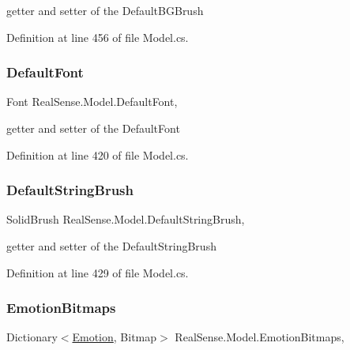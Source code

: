 getter and setter of the Default\+B\+G\+Brush 

Definition at line 456 of file Model.\+cs.

\mbox{\label{class_real_sense_1_1_model_a1e12c6ceac3f412e6b452148b1a97bb1}} 
\subsubsection{\texorpdfstring{Default\+Font}{DefaultFont}}
{\footnotesize\ttfamily Font Real\+Sense.\+Model.\+Default\+Font\hspace{0.3cm}{\ttfamily [get]}, {\ttfamily [set]}}

getter and setter of the Default\+Font 

Definition at line 420 of file Model.\+cs.

\mbox{\label{class_real_sense_1_1_model_aaee076946f30b272e403d39afe033b4e}} 
\subsubsection{\texorpdfstring{Default\+String\+Brush}{DefaultStringBrush}}
{\footnotesize\ttfamily Solid\+Brush Real\+Sense.\+Model.\+Default\+String\+Brush\hspace{0.3cm}{\ttfamily [get]}, {\ttfamily [set]}}

getter and setter of the Default\+String\+Brush 

Definition at line 429 of file Model.\+cs.

\mbox{\label{class_real_sense_1_1_model_a654d0ac6e4e49b884fd3e166039c7bc4}} 
\subsubsection{\texorpdfstring{Emotion\+Bitmaps}{EmotionBitmaps}}
{\footnotesize\ttfamily Dictionary$<$\hyperlink{class_real_sense_1_1_model_a5bf3fde8f53519f7a740d8b4e0399208}{Emotion}, Bitmap$>$ Real\+Sense.\+Model.\+Emotion\+Bitmaps\hspace{0.3cm}{\ttfamily [get]}, {\ttfamily [set]}}

